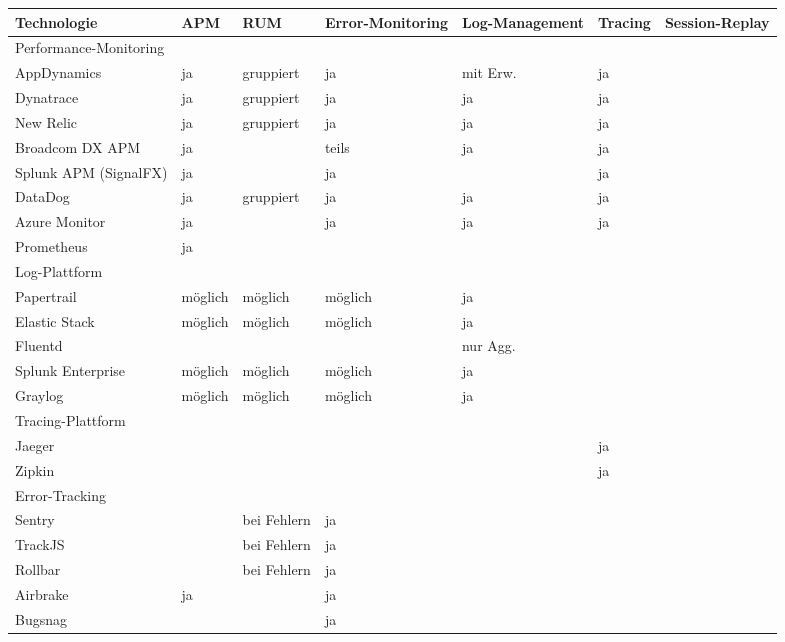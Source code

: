 \begin{table}%
\centering
\addtolength{\leftskip}{-2cm}
\addtolength{\rightskip}{-2cm}
\begin{tabular}{|p{4.15cm}|p{1.4cm}|p{2.0cm}|p{1.9cm}|p{2.0cm}|p{1.4cm}|p{1.4cm}|}
\hline
Technologie & APM & RUM & Error-Monitoring & Log-Management & Tracing & Session-Replay \\
\hline
\hline
\multicolumn{7}{|p{12.25cm}|}{Performance-Monitoring} \\
\hline
AppDynamics & ja & gruppiert & ja & mit Erw. & ja &  \\
\hline
Dynatrace & ja & gruppiert & ja & ja & ja &  \\
\hline
New Relic & ja & gruppiert & ja & ja & ja &  \\
\hline
Broadcom DX APM & ja &  & teils & ja & ja &  \\
\hline
Splunk APM (SignalFX) & ja &  & ja &  & ja &  \\
\hline
DataDog & ja & gruppiert & ja & ja & ja &  \\
\hline
Azure Monitor & ja &  & ja & ja & ja &  \\
\hline
Prometheus & ja &  &  &  &  &  \\
\hline
\hline
\multicolumn{7}{|p{12.25cm}|}{Log-Plattform} \\
\hline
Papertrail & möglich & möglich & möglich & ja &  &  \\
\hline
Elastic Stack & möglich & möglich & möglich & ja &  &  \\
\hline
Fluentd &  &  &  & nur Agg. &  &  \\
\hline
Splunk \mbox{Enterprise} & möglich & möglich & möglich & ja &  &  \\
\hline
Graylog & möglich & möglich & möglich & ja &  &  \\
\hline
\hline
\multicolumn{7}{|p{12.25cm}|}{Tracing-Plattform} \\
\hline
Jaeger &  &  &  &  & ja &  \\
\hline
Zipkin &  &  &  &  & ja &  \\
\hline
\hline
\multicolumn{7}{|p{12.25cm}|}{Error-Tracking} \\
\hline
Sentry &  & bei \mbox{Fehlern} & ja &  &  &  \\
\hline
TrackJS &  & bei \mbox{Fehlern} & ja &  &  &  \\
\hline
Rollbar &  & bei \mbox{Fehlern} & ja &  &  &  \\
\hline
Airbrake & ja &  & ja &  &  &  \\
\hline
Bugsnag &  &  & ja &  &  &  \\

\end{tabular}
\end{table}
